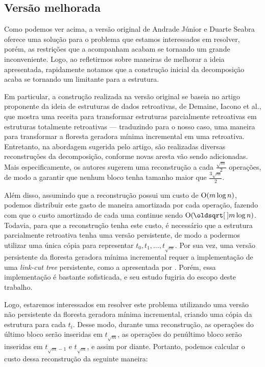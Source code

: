\subsection{Versão melhorada}
\label{sec:rmsf-versao-mel}

Como podemos ver acima, a versão original de Andrade Júnior e Duarte Seabra oferece uma solução para o problema que estamos interessados em resolver, porém, as restrições que a acompanham acabam se tornando um grande inconveniente. Logo, ao refletirmos sobre maneiras de melhorar a ideia apresentada, rapidamente notamos que a construção inicial da decomposição acaba se tornando um limitante para a estrutura.

Em particular, a construção realizada na versão original se baseia no artigo proponente da ideia de estruturas de dados retroativas, de Demaine, Iacono et al., que mostra uma receita para transformar estruturas parcialmente retroativas em estruturas totalmente retroativas --- traduzindo para o nosso caso, uma maneira para transformar a floresta geradora mínima incremental em uma retroativa. Entretanto, na abordagem sugerida pelo artigo, são realizadas diversas reconstruções da decomposição, conforme novas aresta vão sendo adicionadas. Mais especificamente, os autores sugerem uma reconstrução a cada $\frac{\sqrt{m}}{2}$ operações, de modo a garantir que nenhum bloco tenha tamanho maior que $\frac{3\sqrt{m}}{2}$.

Além disso, assumindo que a reconstrução possui um custo de $\mathrm{O}(m \log n)$, podemos distribuir este gasto de maneira amortizada por cada operação, fazendo com que o custo amortizado de cada uma continue sendo $\Oh(\sqrt{m} \log n)$. Todavia, para que a reconstrução tenha este custo, é necessário que a estrutura parcialmente retroativa tenha uma versão persistente, de modo a  podermos utilizar uma única cópia para representar $t_0, t_1, \dots, t_{\sqrt{m}}$. Por sua vez, uma versão persistente da floresta geradora mínima incremental requer a implementação de uma \emph{link-cut tree} persistente, como a apresentada por \citet{10.1007/978-3-540-69903-3_16}. Porém, essa implementação é bastante sofisticada, e seu estudo fugiria do escopo deste trabalho.

Logo, estaremos interessados em resolver este problema utilizando uma versão não persistente da floresta geradora mínima incremental, criando uma cópia da estrutura para cada $t_i$. Desse modo, durante uma reconstrução, as operações do último bloco serão inseridas em $t_{\sqrt{m}}$, as operações do penúltimo bloco serão inseridas em $t_{\sqrt{m} - 1}$ e $t_{\sqrt{m}}$, e assim por diante. Portanto, podemos calcular o custo dessa reconstrução da seguinte maneira:

